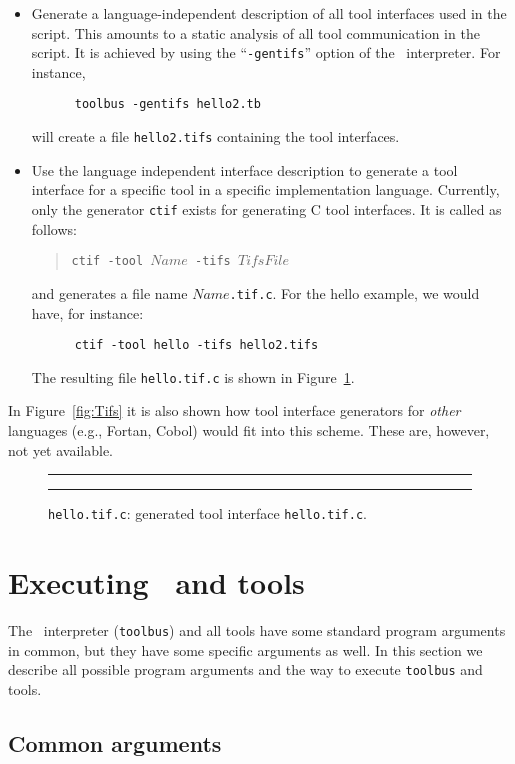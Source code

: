 \begin{itemize}
\item Generate a language-independent
description of all tool interfaces used in the script.
This amounts to a static analysis of all tool communication
in the script. It is achieved by using the ``{\tt -gentifs}''
option of the \TB\ interpreter. For instance,
\begin{verbatim}
      toolbus -gentifs hello2.tb
\end{verbatim}
will create a file {\tt hello2.tifs} containing the tool interfaces.

\item Use the language independent interface description
to generate a tool interface for a specific tool in a specific
implementation language. Currently, only the generator {\tt ctif}
exists for generating C tool interfaces. It is called as follows:
\begin{quote}
      {\tt ctif -tool $Name$ -tifs $TifsFile$}
\end{quote}
and generates a file name $Name${\tt .tif.c}.
For the hello example, we would have, for instance:
\begin{verbatim}
      ctif -tool hello -tifs hello2.tifs
\end{verbatim}
The resulting file {\tt hello.tif.c} is shown in
Figure~\ref{fig:hello.tif.c}.
\end{itemize}

In Figure~\ref{fig:Tifs} it is also shown how tool interface generators
for {\em other} languages (e.g., Fortan, Cobol) would fit into this scheme.
These are, however, not yet available.

\begin{figure}
\rule{\textwidth}{0.5mm}

  \caption{{\tt hello.tif.c}: generated tool interface {\tt hello.tif.c}.}
  \label{fig:hello.tif.c}
\rule{\textwidth}{0.5mm}
\end{figure}

\section{\label{Executing}Executing \TB\ and tools}

The \TB\ interpreter ({\tt toolbus}) and all tools have some
standard program arguments in common, but they have some specific
arguments as well. In this section we describe all possible program arguments
and the way to execute {\tt toolbus} and tools.

\subsection{Common arguments}

